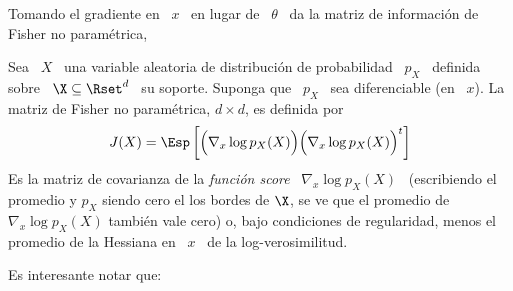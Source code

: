 Tomando  el gradiente  en \  $x$ \  en lugar  de \  $\theta$ \  da la  matriz de
informaci\'on de Fisher no param\'etrica,
%
\begin{definicion}
  Sea \ $X$ \ una variable aleatoria de distribuci\'on de probabilidad \ $p_X$ \
  definida sobre \  $\X \subseteq \Rset^d$ \ su soporte.  Suponga  que \ $p_X$ \
  sea diferenciable (en \ $x$).  La matriz de Fisher no param\'etrica, $d \times
  d$, es definida por
  \[
  J(X) =  \Esp\left[ \Big(  \nabla_x \log p_X(X)  \Big) \Big(  \nabla_x \log
      p_X(X) \Big)^t \right]
  \]
  Es  la matriz  de covarianza  de  la {\it  funci\'on score}  \ $\nabla_x  \log
  p_X(X)$ \ (escribiendo el promedio y  $p_X$ siendo cero el los bordes de $\X$,
  se ve que  el promedio de $\nabla_x \log p_X(X)$ tambi\'en  vale cero) o, bajo
  condiciones de regularidad, menos el promedio de  la Hessiana en \ $x$ \ de la
  log-verosimilitud.
\end{definicion}
%
Es interesante notar que:
%
